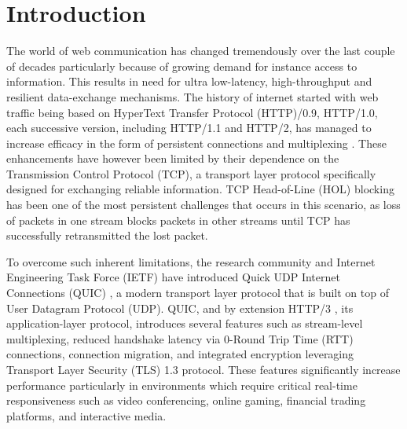 




\chapter{Introduction}
\label{chap\:Introduction}

The world of web communication has changed tremendously over the last couple of decades particularly because of growing demand for instance access to information. This results in need for ultra low-latency, high-throughput and resilient data-exchange mechanisms. The history of internet started with web traffic being based on HyperText Transfer Protocol (HTTP)/0.9, HTTP/1.0, each successive version, including HTTP/1.1 and HTTP/2, has managed to increase efficacy in the form of persistent connections and multiplexing \cite{kurose2017}. These enhancements have however been limited by their dependence on the Transmission Control Protocol (TCP), a transport layer protocol specifically designed for exchanging reliable information. TCP Head-of-Line (HOL) blocking has been one of the most persistent challenges that occurs in this scenario, as loss of packets in one stream blocks packets in other streams until TCP has successfully retransmitted the lost packet.

To overcome such inherent limitations, the research community and Internet Engineering Task Force (IETF) have introduced Quick UDP Internet Connections (QUIC) \cite{rfc9000}, a modern transport layer protocol that is built on top of User Datagram Protocol (UDP). QUIC, and by extension HTTP/3 \cite{rfc9114}, its application-layer protocol, introduces several features such as stream-level multiplexing, reduced handshake latency via 0-Round Trip Time (RTT) connections, connection migration, and integrated encryption leveraging Transport Layer Security (TLS) 1.3 protocol. These features significantly increase performance particularly in environments which require critical real-time responsiveness such as video conferencing, online gaming, financial trading platforms, and interactive media.

